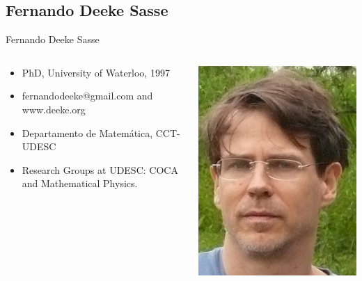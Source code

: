 \documentclass{beamer}
\begin{document}
\subsection{Fernando Deeke Sasse}
\begin{frame}{Fernando Deeke Sasse}

 \begin{columns}
 \begin{column}{0.5\textwidth}  
\begin{itemize}
  \item PhD, University of Waterloo, 1997
  \item fernandodeeke@gmail.com and  www.deeke.org
  \item Departamento de Matem\'atica, CCT- UDESC
  \item Research Groups at UDESC: COCA  and Mathematical Physics.
\end{itemize}

 \end{column}

   \begin{column}{0.5\textwidth}  %
  \begin{flushright}
   \includegraphics[scale=0.3,keepaspectratio]{images/fernando.jpg} 
  \end{flushright} 
   \end{column} %
 \end{columns}


\end{frame}
\end{document}
